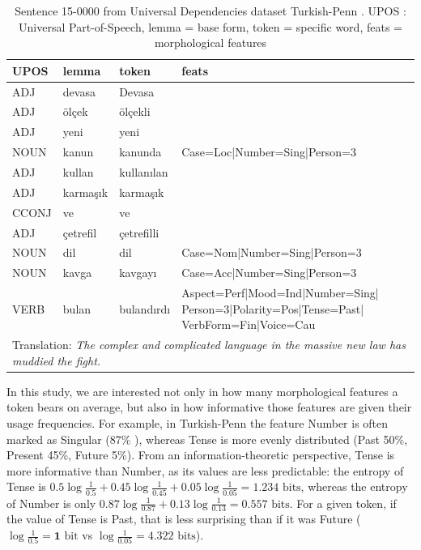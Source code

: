 \documentclass[USenglish]{article}
\begin{document}
\begin{table}[ht]
    \centering
    \caption{Sentence 15-0000 from Universal Dependencies dataset Turkish-Penn \citep{kuzgun_2020_UD_turkish_penn}. UPOS : Universal Part-of-Speech, lemma = base form, token = specific word, feats = morphological features} %
    \label{tab:turkish_example}   
    \begin{tabular}{p{1.5cm}p{2cm}p{2cm}p{5cm}}
\toprule 
	\textbf{UPOS}	&	\textbf{lemma}	&	\textbf{token}	&	\textbf{feats}	\\
    \midrule
	ADJ	&	devasa	&	Devasa	&	\\    \midrule
	ADJ	&	ölçek	&	ölçekli	&\\    \midrule
ADJ	&	yeni	&	yeni	&		\\    \midrule
	NOUN	&	kanun	&	kanunda	&	Case=Loc|Number=Sing|Person=3	\\    \midrule
	ADJ	&	kullan	&	kullanılan	&		\\    \midrule
ADJ	&	karmaşık	&	karmaşık	&\\    \midrule
CCONJ	&	ve	&	ve	&		\\    \midrule
ADJ	&	çetrefil	&	çetrefilli	&		\\    \midrule
	NOUN	&	dil	&	dil	&	Case=Nom|Number=Sing|Person=3	\\    \midrule
	NOUN	&	kavga	&	kavgayı	&	Case=Acc|Number=Sing|Person=3	\\    \midrule
	VERB	&	bulan	&	bulandırdı	&	Aspect=Perf|Mood=Ind|Number=Sing| Person=3|Polarity=Pos|Tense=Past| VerbForm=Fin|Voice=Cau	\\\midrule
   \multicolumn{4}{p{11cm}}{Translation: \textit{The complex and complicated language in the massive new law has muddied the fight.}}\\    \bottomrule
    \end{tabular}
\end{table}

In this study, we are interested not only in how many morphological features a token bears on average, but also in how informative those features are given their usage frequencies.
For example, in Turkish-Penn the feature Number is often marked as Singular (87\% ), whereas Tense is more evenly distributed (Past 50\%, Present 45\%, Future 5\%).
From an information-theoretic perspective, Tense is more informative than Number, as its values are less predictable: the entropy of Tense is $0.5\log{\frac{1}{0.5}}+0.45\log{\frac{1}{0.45}}+0.05\log{\frac{1}{0.05}}=\mathbf{1.234}\text{ bits}$, whereas the entropy of Number is only $0.87\log{\frac{1}{0.87}}+0.13\log{\frac{1}{0.13}}=\mathbf{0.557}\text{ bits}$. 
For a given token, if the value of Tense is Past, that is less surprising than if it was Future ($\log{\frac{1}{0.5}}=\mathbf{1}\text{ bit}$ vs $\log{\frac{1}{0.05}}=\mathbf{4.322}\text{ bits}$).
\end{document}
